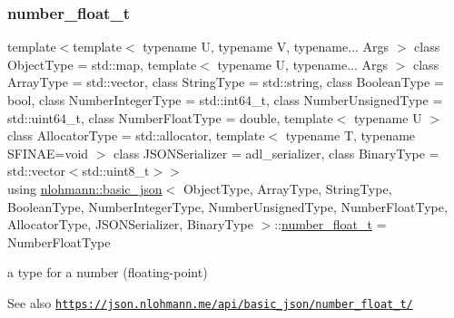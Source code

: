 \subsubsection{\texorpdfstring{number\+\_\+float\+\_\+t}{number\_float\_t}}
{\footnotesize\ttfamily template$<$template$<$ typename U, typename V, typename... Args $>$ class Object\+Type = std\+::map, template$<$ typename U, typename... Args $>$ class Array\+Type = std\+::vector, class String\+Type  = std\+::string, class Boolean\+Type  = bool, class Number\+Integer\+Type  = std\+::int64\+\_\+t, class Number\+Unsigned\+Type  = std\+::uint64\+\_\+t, class Number\+Float\+Type  = double, template$<$ typename U $>$ class Allocator\+Type = std\+::allocator, template$<$ typename T, typename S\+F\+I\+N\+A\+E=void $>$ class J\+S\+O\+N\+Serializer = adl\+\_\+serializer, class Binary\+Type  = std\+::vector$<$std\+::uint8\+\_\+t$>$$>$ \\
using \hyperlink{classnlohmann_1_1basic__json}{nlohmann\+::basic\+\_\+json}$<$ Object\+Type, Array\+Type, String\+Type, Boolean\+Type, Number\+Integer\+Type, Number\+Unsigned\+Type, Number\+Float\+Type, Allocator\+Type, J\+S\+O\+N\+Serializer, Binary\+Type $>$\+::\hyperlink{classnlohmann_1_1basic__json_a5b8abaebd922d82d69756327c0c347e6}{number\+\_\+float\+\_\+t} =  Number\+Float\+Type}



a type for a number (floating-\/point) 

\begin{DoxySeeAlso}{See also}
\href{https://json.nlohmann.me/api/basic_json/number_float_t/}{\tt https\+://json.\+nlohmann.\+me/api/basic\+\_\+json/number\+\_\+float\+\_\+t/} 
\end{DoxySeeAlso}
\mbox{\label{classnlohmann_1_1basic__json_a11e390944da90db83089eb2426a749d3}} 
